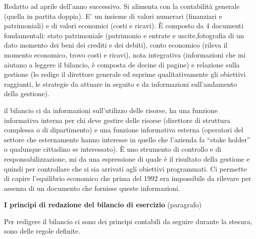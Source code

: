 \documentclass[]{article}
\begin{document}
Redatto ad aprile dell'anno successivo. Si alimenta con la contabilità
generale (quella in partita doppia). E' un insieme di valori numerari
(finanziari e patrimoniali) e di valori economici (costi e ricavi). È
composto da 4 documenti fondamentali: stato patrimoniale (patrimonio e
entrate e uscite,fotografia di un dato momento dei beni dei crediti e
dei debiti), conto economico (rileva il momento economico, trovo costi e
ricavi), nota integrativa (informazioni che mi aiutano a leggere il
bilancio, è composta de decine di pagine) e relazione sulla gestione (lo
redige il direttore generale ed esprime qualitativamente gli obiettivi
raggiunti, le strategie da attuare in seguito e da informazioni
sull'andamento della gestione).

il bilancio ci da informazioni sull'utilizzo delle risorse, ha una
funzione informativa interna per chi deve gestire delle risorse
(direttore di struttura complessa o di dipartimento) e una funzione
informativa esterna (operatori del settore che esternamente hanno
interesse in quello che l'azienda fa ``stake holder'' o qualunque
cittadino se interessato). È uno strumento di controllo e di
responsabilizzazione, mi da una espressione di quale è il risultato
della gestione e quindi per controllare che si sia arrivati agli
obiettivi programmati. Ci permette di capire l'equilibrio economico che
prima del 1992 era impossibile da rilevare per assenza di un documento
che fornisse queste informazioni.

\textbf{I principi di redazione del bilancio di esercizio} (paragrafo)

Per redigere il bilancio ci sono dei principi contabili da seguire
durante la stesura, sono delle regole definite.
\end{document}
